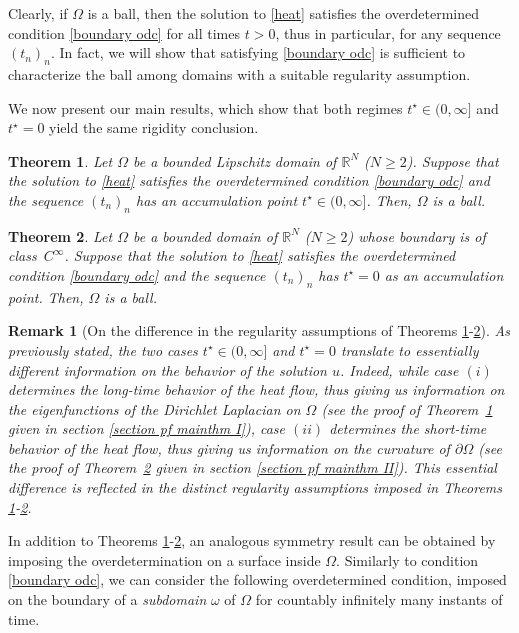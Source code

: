 \documentclass[a4paper,11pt]{article}
\newtheorem{mainthm}{Theorem}
\newtheorem{remark}[theorem]{Remark}
\numberwithin{equation}{section}
\begin{document}
Clearly, if $\Omega$ is a ball, then the solution to \eqref{heat} satisfies the overdetermined condition \eqref{boundary odc} for all times $t>0$, thus in particular, for any sequence $(t_n)_n$. In fact, we will show that satisfying \eqref{boundary odc} is sufficient to characterize the ball among domains with a suitable regularity assumption.

We now present our main results, which show that both regimes $t^\star\in (0,\infty]$ and $t^\star=0$ yield the same rigidity conclusion.
\begin{mainthm}\label{mainthm I}
Let $\Omega$ be a bounded Lipschitz domain of $\mathbb{R}^N$ ($N\ge 2$). Suppose that the solution to \eqref{heat} satisfies the overdetermined condition \eqref{boundary odc} and the sequence $(t_n)_{n}$ has an accumulation point $t^\star\in (0,\infty]$. Then, $\Omega$ is a ball.
\end{mainthm}

\begin{mainthm}\label{mainthm II}
Let $\Omega$ be a bounded domain of $\mathbb{R}^N$ ($N\ge 2$) whose boundary is of class~$C^\infty$. Suppose that the solution to \eqref{heat} satisfies the overdetermined condition \eqref{boundary odc} and the sequence $(t_n)_{n}$ has $t^\star=0$ as an accumulation point. Then, $\Omega$ is a ball.
\end{mainthm}

\begin{remark}[On the difference in the regularity assumptions of Theorems \ref{mainthm I}-\ref{mainthm II}]
As previously stated, the two cases $t^\star\in (0,\infty]$ and $t^\star=0$ translate to essentially different information on the behavior of the solution $u$. Indeed, while case $(i)$ determines the long-time behavior of the heat flow, thus giving us information on the eigenfunctions of the Dirichlet Laplacian on $\Omega$ (see the proof of Theorem~\ref{mainthm I} given in section \ref{section pf mainthm I}), case $(ii)$ determines the short-time behavior of the heat flow, thus giving us information on the curvature of $\partial\Omega$ (see the proof of Theorem~\ref{mainthm II} given in section \ref{section pf mainthm II}).
This essential difference is reflected in the distinct regularity assumptions imposed in Theorems \ref{mainthm I}-\ref{mainthm II}. 
\end{remark}

In addition to Theorems \ref{mainthm I}-\ref{mainthm II}, an analogous symmetry result can be obtained by imposing the overdetermination on a surface inside $\Omega$. 
Similarly to condition \eqref{boundary odc}, we can consider the following overdetermined condition, imposed on the boundary of a \emph{subdomain} $\omega$ of $\Omega$ for countably infinitely many instants of time.  
\end{document}
